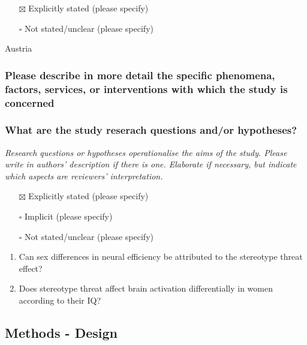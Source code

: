 \documentclass[
  doc, a4paper]{apa7}
\providecommand{\tightlist}{%
  \setlength{\itemsep}{0pt}\setlength{\parskip}{0pt}}
\begin{document}
\begin{itemize}
\tightlist
\item[$\boxtimes$]
  Explicitly stated (please specify)\\
\item[$\square$]
  Not stated/unclear (please specify)
\end{itemize}

Austria

\subsubsection{Please describe in more detail the specific phenomena, factors, services, or interventions with which the study is concerned}\label{please-describe-in-more-detail-the-specific-phenomena-factors-services-or-interventions-with-which-the-study-is-concerned}

\subsubsection{What are the study reserach questions and/or hypotheses?}\label{what-are-the-study-reserach-questions-andor-hypotheses}

\emph{Research questions or hypotheses operationalise the aims of the study. Please write in authors' description if there is one. Elaborate if necessary, but indicate which aspects are reviewers' interpretation.}

\begin{itemize}
\tightlist
\item[$\boxtimes$]
  Explicitly stated (please specify)\\
\item[$\square$]
  Implicit (please specify)\\
\item[$\square$]
  Not stated/unclear (please specify)
\end{itemize}

\begin{enumerate}
\def\labelenumi{\arabic{enumi}.}
\tightlist
\item
  Can sex differences in neural efficiency be attributed to the stereotype threat effect?
\item
  Does stereotype threat affect brain activation differentially in women according to their IQ?
\end{enumerate}

\subsection{Methods - Design}\label{methods---design}
\end{document}
